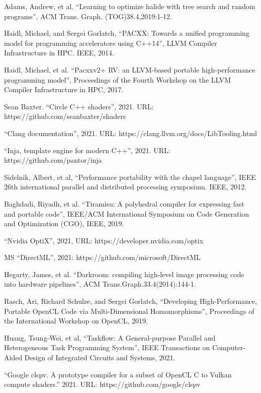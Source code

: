 \documentclass[11pt,fleqn,english,russian]{report} %
\begin{document}
\begin{thebibliography}{10}
	 Adams, Andrew, et al. ``Learning to optimize halide with tree search and random programs'', ACM Trans. Graph. (TOG)38.4,2019:1-12. 
	
	 Haidl, Michael, and Sergei Gorlatch, ``PACXX: Towards a unified programming model for programming accelerators using C++14'', LLVM Compiler Infrastructure in HPC. IEEE, 2014.
	
	 Haidl, Michael, et al. ``Pacxxv2+ RV: an LLVM-based portable high-performance programming model'', Proceedings of the Fourth Workshop on the LLVM Compiler Infrastructure in HPC, 2017. 
	
	 Sean Baxter. ``Circle C++ shaders'', 2021. URL: https://github.com/seanbaxter/shaders  
	
	 ``Clang documentation'', 2021. URL: https://clang.llvm.org/docs/LibTooling.html
	
	 ``Inja, template engine for modern C++'', 2021. URL: https://github.com/pantor/inja
	
	 Sidelnik, Albert, et al, ``Performance portability with the chapel language'', IEEE 26th international parallel and distributed processing symposium. IEEE, 2012. 
	
	 Baghdadi, Riyadh, et al. ``Tiramisu: A polyhedral compiler for expressing fast and portable code'', IEEE/ACM International Symposium on Code Generation and Optimization (CGO), IEEE, 2019. 
	
	 ``Nvidia OptiX'', 2021, URL: https://developer.nvidia.com/optix 
	
	 MS ``DirectML'', 2021: https://github.com/microsoft/DirectML 
	
	 Hegarty, James, et al. ``Darkroom: compiling high-level image processing code into hardware pipelines'', ACM Trans.Graph.33.4(2014):144-1. 
	
	 Rasch, Ari, Richard Schulze, and Sergei Gorlatch, ``Developing High-Performance, Portable OpenCL Code via Multi-Dimensional Homomorphisms'', Proceedings of the International Workshop on OpenCL, 2019. 
	
	 Huang, Tsung-Wei, et al, ``Taskflow: A General-purpose Parallel and Heterogeneous Task Programming System'', IEEE Transactions on Computer-Aided Design of Integrated Circuits and Systems, 2021. 
	
	 ``Google clspv. A prototype compiler for a subset of OpenCL C to Vulkan compute shaders.'' 2021. URL: https://github.com/google/clspv
	

\end{thebibliography}
\end{document}
